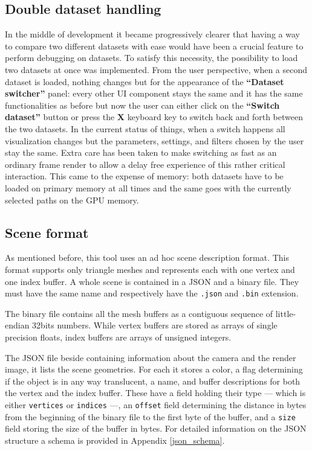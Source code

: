 \subsection{Double dataset handling}
In the middle of development it became progressively clearer that having a way to compare two different datasets with ease would have been a crucial feature to perform debugging on datasets. To satisfy this necessity, the possibility to load two datasets at once was implemented. From the user perspective, when a second dataset is loaded, nothing changes but for the appearance of the \textbf{“Dataset switcher”} panel: every other UI component stays the same and it has the same functionalities as before but now the user can either click on the \textbf{“Switch dataset”} button or press the \textbf{X} keyboard key to switch back and forth between the two datasets. In the current status of things, when a switch happens all visualization changes but the parameters, settings, and filters chosen by the user stay the same. Extra care has been taken to make switching as fast as an ordinary frame render to allow a delay free experience of this rather critical interaction. This came to the expense of memory: both datasets have to be loaded on primary memory at all times and the same goes with the currently selected paths on the GPU memory.


\subsection{Scene format}
\label{scene_format}

As mentioned before, this tool uses an ad hoc scene description format. This format supports only triangle meshes and represents each with one vertex and one index buffer. A whole scene is contained in a JSON \cite{rfc8259} and a binary file. They must have the same name and respectively have the \texttt{.json} and \texttt{.bin} extension. 

The binary file contains all the mesh buffers as a contiguous sequence of little-endian 32bits numbers. While vertex buffers are stored as arrays of single precision floats, index buffers are arrays of unsigned integers. 

The JSON file beside containing information about the camera and the render image, it lists the scene geometries. For each it stores a color, a flag determining if the object is in any way translucent, a name, and buffer descriptions for both the vertex and the index buffer. These have a field holding their type --- which is either \texttt{vertices} or \texttt{indices} ---, an \texttt{offset} field determining the distance in bytes from the beginning of the binary file to the first byte of the buffer, and a \texttt{size} field storing the size of the buffer in bytes. For detailed information on the JSON structure a schema is provided in Appendix \ref{json_schema}.

